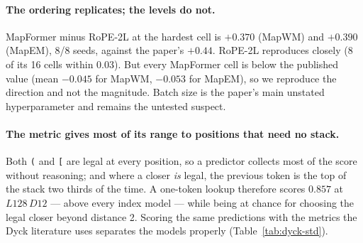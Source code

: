 \documentclass[10pt]{article}
\begin{document}
\paragraph{The ordering replicates; the levels do not.} MapFormer minus RoPE-2L at the hardest cell is
$+0.370$ (MapWM) and $+0.390$ (MapEM), 8/8 seeds, against the paper's $+0.44$. RoPE-2L reproduces closely
(8 of its 16 cells within $0.03$). But every MapFormer cell is below the published value (mean $-0.045$ for
MapWM, $-0.053$ for MapEM), so we reproduce the direction and not the magnitude. Batch size is the paper's
main unstated hyperparameter and remains the untested suspect.

\paragraph{The metric gives most of its range to positions that need no stack.} Both \texttt{(} and
\texttt{[} are legal at every position, so a predictor collects most of the score without reasoning;
and where a closer \emph{is} legal, the previous token is the top of the stack two thirds of the time.
A one-token lookup therefore scores $0.857$ at $L128\,D12$ --- above every index model --- while being at
chance for choosing the legal closer beyond distance 2. Scoring the same predictions with the metrics the
Dyck literature uses separates the models properly (Table~\ref{tab:dyck-std}).
\end{document}
